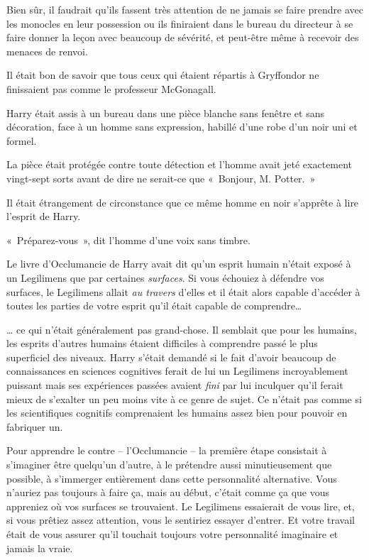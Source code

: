 Bien sûr, il faudrait qu'ils fassent très attention de ne jamais se faire prendre avec les monocles en leur possession ou ils finiraient dans le bureau du directeur à se faire donner la leçon avec beaucoup de sévérité, et peut-être même à recevoir des menaces de renvoi.

Il était bon de savoir que tous ceux qui étaient répartis à Gryffondor ne finissaient pas comme le professeur McGonagall.

\later

Harry était assis à un bureau dans une pièce blanche sans fenêtre et sans décoration, face à un homme sans expression, habillé d’une robe d'un noir uni et formel.

La pièce était protégée contre toute détection et l'homme avait jeté exactement vingt-sept sorts avant de dire ne serait-ce que «~Bonjour, M. Potter.~»

Il était étrangement de circonstance que ce même homme en noir s'apprête à lire l'esprit de Harry.

«~Préparez-vous~», dit l'homme d'une voix sans timbre.

Le livre d'Occlumancie de Harry avait dit qu'un esprit humain n'était exposé à un Legilimens que par certaines \emph{surfaces}. Si vous échouiez à défendre vos surfaces, le Legilimens allait \emph{au travers} d'elles et il était alors capable d'accéder à toutes les parties de votre esprit qu'il était capable de comprendre…

… ce qui n'était généralement pas grand-chose. Il semblait que pour les humains, les esprits d'autres humains étaient difficiles à comprendre passé le plus superficiel des niveaux. Harry s'était demandé si le fait d'avoir beaucoup de connaissances en sciences cognitives ferait de lui un Legilimens incroyablement puissant mais ses expériences passées avaient \emph{fini} par lui inculquer qu'il ferait mieux de s'exalter un peu moins vite à ce genre de sujet. Ce n'était pas comme si les scientifiques cognitifs comprenaient les humains assez bien pour pouvoir en fabriquer un.

Pour apprendre le contre -- l'Occlumancie -- la première étape consistait à s'imaginer être quelqu'un d'autre, à le prétendre aussi minutieusement que possible, à s'immerger entièrement dans cette personnalité alternative. Vous n'auriez pas toujours à faire ça, mais au début, c'était comme ça que vous appreniez où vos surfaces se trouvaient. Le Legilimens essaierait de vous lire, et, si vous prêtiez assez attention, vous le sentiriez essayer d'entrer. Et votre travail était de vous assurer qu'il touchait toujours votre personnalité imaginaire et jamais la vraie.

